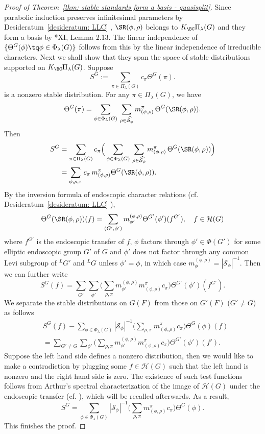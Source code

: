 \documentclass[11pt,letterpaper]{amsart}
\numberwithin{equation}{section}
\begin{document}
\begin{proof}[Proof of Theorem~\ref{thm: stable standards form a basis - quasisplit}]
Since parabolic induction preserves infinitesimal parameters by Desideratum~\ref{desideratum: LLC} \Hai, $\SR(\phi, \rho)$ belongs to $K_{\BC}\Pi_{\lambda}(G)$ and they form a basis  by \cite{BorelWallach:2000}*{XI, Lemma 2.13}. The linear independence of $\{\Theta^{G}(\phi)\tq \phi \in \Phi_{\lambda}(G)\}$ follows from this by the linear independence of irreducible characters. Next we shall show that they span the space of stable distributions supported on $K_{\BC}\Pi_{\lambda}(G)$. Suppose 
\[
S^{G} := \sum_{\pi \in \Pi_{\lambda}(G)} c_{\pi} \Theta^{G}(\pi).
\] 
is a nonzero stable distribution. For any $\pi \in \Pi_{\lambda}(G)$, we have
\[
\Theta^{G}(\pi) = \sum_{\phi \in \Phi_{\lambda}(G)} \, \sum_{\rho \in \widehat{\mathcal{S}_{\phi}}} m^{\pi}_{(\phi, \rho)} \, \Theta^{G}(\SR(\phi, \rho)).
\]
Then
\begin{align*}
S^{G} & = \sum_{\pi \in \Pi_{\lambda}(G)} c_{\pi} \Big( \sum_{\phi \in \Phi_{\lambda}(G)} \, \sum_{\rho \in \widehat{\mathcal{S}_{\phi}}} m^{\pi}_{(\phi, \rho)} \, \Theta^{G}(\SR(\phi, \rho))\Big) \\
& = \sum_{\phi, \rho, \pi} c_{\pi} \, m^{\pi}_{(\phi, \rho)} \Theta^{G}(\SR(\phi, \rho)).
\end{align*}
By the inversion formula of endoscopic character relations (cf. Desideratum~\ref{desideratum: LLC} \ECR),
\[
\Theta^{G}(\SR(\phi, \rho))(f) = \sum_{(G', \phi')} m^{(\phi, \rho)}_{\phi'} \Theta^{G'}(\phi')(f^{G'}), \quad f \in \mathcal{H}(G)
\]
where $f^{G'}$ is the endoscopic transfer of $f$, $\phi$ factors through $\phi' \in \Phi(G')$ for some elliptic endoscopic group $G'$ of $G$ and $\phi'$ does not factor through any common Levi subgroup of ${}^LG'$ and ${}^LG$ unless $\phi' = \phi$, in which case $m^{(\phi, {\rho})}_{\phi} = |\mathcal{S}_{\phi}|^{-1}$. Then we can further write
\[
S^{G}(f) = \sum_{G'} \sum_{\phi'} \Big( \sum_{\rho, \pi} m^{(\phi, \rho)}_{\phi'} m^{\pi}_{(\phi, \rho)} c_{\pi} \Big) \Theta^{G'}(\phi')(f^{G'}).
\]
We separate the stable distributions on $G(F)$ from those on $G'(F)$ ($G' \neq G$) as follows
\begin{align}
\label{eq: stable}
&S^{G}(f) - \sum_{\phi \in \Phi_{\lambda}(G)} |\mathcal{S}_{\phi}|^{-1} \Big( \sum_{\rho, \pi} m^{\pi}_{(\phi, \rho)} c_{\pi} \Big) \Theta^{G}(\phi)(f) \\
&= \sum_{G' \neq G} \sum_{\phi'} \Big( \sum_{\rho, \pi} m^{(\phi, \rho)}_{\phi'} m^{\pi}_{(\phi, \rho)} c_{\pi} \Big) \Theta^{G'}(\phi')(f').
\end{align}
Suppose the left hand side defines a nonzero distribution, then we would like to make a contradiction by plugging some $f \in \mathcal{H}(G)$ such that the left hand is nonzero and the right hand side is zero. The existence of such test functions follows from Arthur's spectral characterization of the image of $\mathcal{H}(G)$ under the endoscopic transfer (cf. \cite{Art96}), which will be recalled afterwards. As a result,
\[
S^{G} = \sum_{\phi \in \Phi_{\lambda}(G)} |\mathcal{S}_{\phi}|^{-1} \Big( \sum_{\rho, \pi} m^{\pi}_{(\phi, \rho)} c_{\pi} \Big) \Theta^{G}(\phi).
\]
This finishes the proof.
\end{proof}
\end{document}
